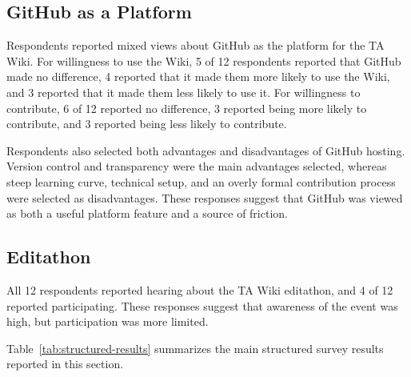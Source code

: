 \documentclass[11pt]{article}
\newcommand{\td}[1]{\item \textcolor{red!70!black}{TODO: #1}}
\begin{document}
\subsection{GitHub as a Platform}
Respondents reported mixed views about GitHub as the platform for the TA Wiki. For willingness to use the Wiki, 5 of 12 respondents reported that GitHub made no difference, 4 reported that it made them more likely to use the Wiki, and 3 reported that it made them less likely to use it. For willingness to contribute, 6 of 12 reported no difference, 3 reported being more likely to contribute, and 3 reported being less likely to contribute.

Respondents also selected both advantages and disadvantages of GitHub hosting. Version control and transparency were the main advantages selected, whereas steep learning curve, technical setup, and an overly formal contribution process were selected as disadvantages. These responses suggest that GitHub was viewed as both a useful platform feature and a source of friction.

\subsection{Editathon}
All 12 respondents reported hearing about the TA Wiki editathon, and 4 of 12 reported participating. These responses suggest that awareness of the event was high, but participation was more limited.

Table~\ref{tab:structured-results} summarizes the main structured survey results reported in this section.
\end{document}
